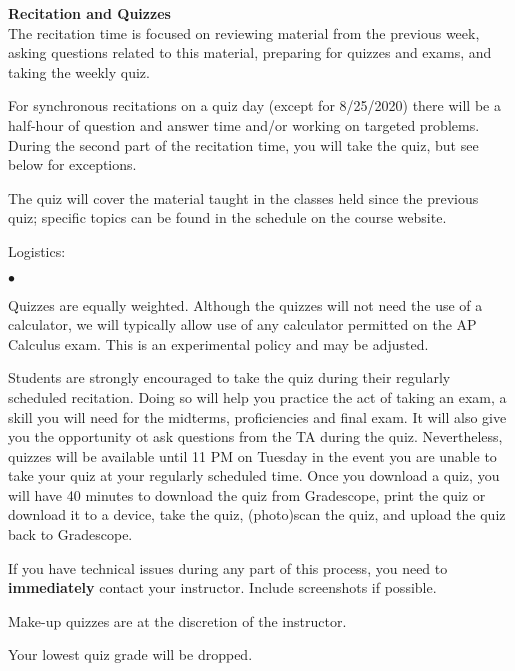 \documentclass[12pt]{article}
\renewcommand{\emph}[1]{\textsf{\textbf{#1}}}
\newcommand{\localhead}[1]{\par\smallskip\textbf{#1}\nobreak\\}%
\def\heading#1{\localhead{\large\emph{#1}}}
\newenvironment{clist}%
{\bgroup\parskip 0pt\begin{list}{$\bullet$}{\partopsep 4pt\topsep 0pt\itemsep -2pt}}%
{\end{list}\egroup}%
\begin{document}
\heading{Recitation and Quizzes}
The recitation time is focused on reviewing material from the previous week, asking questions related to this material, preparing for quizzes and exams, and taking the weekly quiz.

For synchronous recitations on a quiz day (except for 8/25/2020) there will be a half-hour of question and answer time and/or working on targeted problems. During the second part of the recitation time, you will take the quiz, but see below for exceptions.

The quiz will cover the material taught in the classes held since the previous quiz; specific topics can be found in the schedule on the course website.  

Logistics:

\begin{clist}
\item Quizzes are equally weighted.  
Although the quizzes will not need the use of a calculator, 
we will typically allow use of 
any calculator permitted on the AP Calculus exam.  This
is an experimental policy and may be adjusted.



\item Students are strongly encouraged to take the quiz during their
regularly scheduled recitation.  Doing so will help you practice the
act of taking an exam, a skill you will need for the midterms, proficiencies and final exam.  It will also give you the opportunity ot ask questions from the TA during the quiz. Nevertheless, quizzes will be available until 11 PM on Tuesday in the event you are unable to 
take your quiz at your regularly scheduled time.  Once you download a  quiz, you will have 40 minutes to download the quiz from  Gradescope, print the quiz or download it to a device, take the quiz, (photo)scan the quiz, and upload the quiz back to Gradescope. 
\item If you have technical issues during any part of this process, you need to \emph{immediately} contact your instructor. Include screenshots if possible.
\item Make-up quizzes are at the discretion of the instructor.
\item Your lowest quiz grade will be dropped. 
\end{clist}
\end{document}
